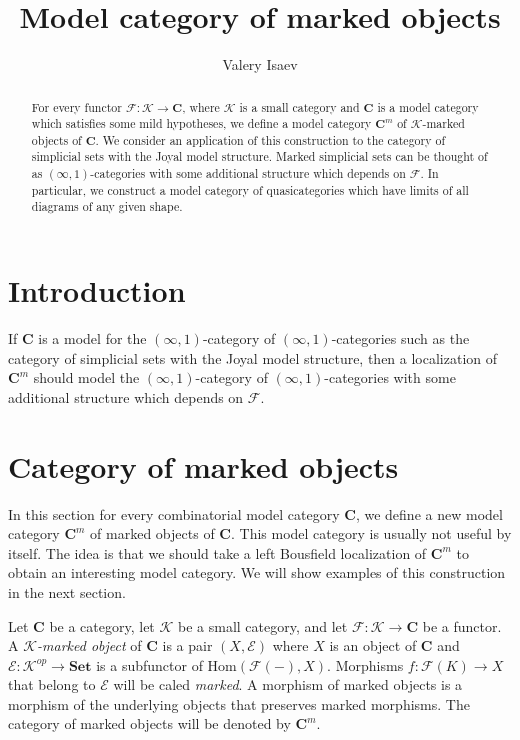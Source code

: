 \documentclass[reqno]{amsart}
\theoremstyle{definition}
\theoremstyle{remark}
\newcommand{\cat}[1]{\mathbf{#1}}
\newcommand{\C}{\cat{C}}
\newcommand{\Set}{\cat{Set}}
\newcommand{\K}{$\mathcal{K}$}
\newcommand{\Hom}{\mathrm{Hom}}
\numberwithin{figure}{section}
\begin{document}
\title{Model category of marked objects}

\author{Valery Isaev}

\begin{abstract}
For every functor $\mathcal{F} : \mathcal{K} \to \mathbf{C}$, where $\mathcal{K}$ is a small category and $\mathbf{C}$ is a model category which satisfies some mild hypotheses,
we define a model category $\mathbf{C}^m$ of $\mathcal{K}$-marked objects of $\mathbf{C}$.
We consider an application of this construction to the category of simplicial sets with the Joyal model structure.
Marked simplicial sets can be thought of as $(\infty,1)$-categories with some additional structure which depends on $\mathcal{F}$.
In particular, we construct a model category of quasicategories which have limits of all diagrams of any given shape.
\end{abstract}

\maketitle

\section{Introduction}

If $\mathbf{C}$ is a model for the $(\infty,1)$-category of $(\infty,1)$-categories such as the category of simplicial sets with the Joyal model structure,
then a localization of $\mathbf{C}^m$ should model the $(\infty,1)$-category of $(\infty,1)$-categories with some additional structure which depends on $\mathcal{F}$.

\section{Category of marked objects}
\label{sec:marked}

In this section for every combinatorial model category $\C$, we define a new model category $\C^m$ of marked objects of $\C$.
This model category is usually not useful by itself.
The idea is that we should take a left Bousfield localization of $\C^m$ to obtain an interesting model category.
We will show examples of this construction in the next section.

\begin{defn}
Let $\C$ be a category, let $\mathcal{K}$ be a small category, and let $\mathcal{F} : \mathcal{K} \to \C$ be a functor.
A \emph{\K-marked object} of $\C$ is a pair $(X,\mathcal{E})$ where $X$ is an object of $\C$ and $\mathcal{E} : \mathcal{K}^{op} \to \Set$ is a subfunctor of $\Hom(\mathcal{F}(-),X)$.
Morphisms $f : \mathcal{F}(K) \to X$ that belong to $\mathcal{E}$ will be caled \emph{marked}.
A morphism of marked objects is a morphism of the underlying objects that preserves marked morphisms.
The category of marked objects will be denoted by $\C^m$.
\end{defn}
\end{document}
